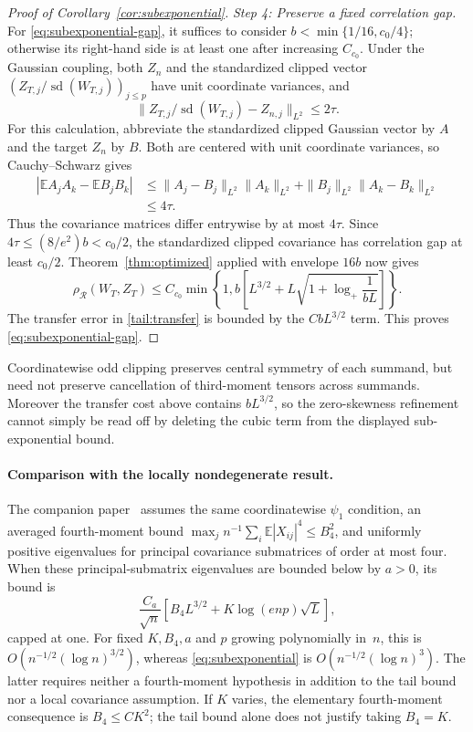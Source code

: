 \documentclass[11pt,letterpaper]{article}
\theoremstyle{remark}
\newcommand{\E}{\mathbb E}
\newcommand{\rh}{\rho_{\mathcal R}}
\begin{document}
\begin{proof}[Proof of Corollary~\ref{cor:subexponential}]
\emph{Step 4: Preserve a fixed correlation gap.}
For \eqref{eq:subexponential-gap}, it suffices to consider
\(b<\min\{1/16,c_0/4\}\); otherwise its right-hand side is at
least one after increasing \(C_{c_0}\).
Under the Gaussian coupling, both \(Z_n\) and the standardized clipped
vector \((Z_{T,j}/\operatorname{sd}(W_{T,j}))_{j\le p}\) have unit coordinate variances, and
\[
 \|Z_{T,j}/\operatorname{sd}(W_{T,j})-Z_{n,j}\|_{L^2}\le2\tau.
\]
For this calculation, abbreviate the standardized clipped Gaussian
vector by \(A\) and the target \(Z_n\) by \(B\). Both are centered
with unit coordinate variances, so Cauchy--Schwarz gives
\[
 \begin{aligned}
 |\E A_jA_k-\E B_jB_k|
 &\le\|A_j-B_j\|_{L^2}\|A_k\|_{L^2}
       +\|B_j\|_{L^2}\|A_k-B_k\|_{L^2}\\
 &\le4\tau.
 \end{aligned}
\]
Thus the covariance matrices differ entrywise by at most \(4\tau\). Since
\(4\tau\le(8/e^2)b<c_0/2\), the standardized clipped covariance
has correlation gap at least \(c_0/2\).
Theorem~\ref{thm:optimized} applied with envelope \(16b\) now gives
\[
 \rh(W_T,Z_T)\le C_{c_0}\min\left\{1,
 b\left[L^{3/2}+L\sqrt{1+\log_+\frac1{bL}}\right]\right\}.
\]
The transfer error in \eqref{tail:transfer} is bounded by the
\(CbL^{3/2}\) term. This proves \eqref{eq:subexponential-gap}.
\end{proof}

Coordinatewise odd clipping preserves central symmetry of each summand,
but need not preserve cancellation of third-moment tensors across summands.
Moreover the transfer cost above contains \(bL^{3/2}\), so the
zero-skewness refinement cannot simply be read off by deleting the
cubic term from the displayed sub-exponential bound.

\paragraph{Comparison with the locally nondegenerate result.}
The companion paper~\cite[Corollary~1]{Local} assumes the same
coordinatewise \(\psi_1\) condition, an averaged fourth-moment bound
\(\max_jn^{-1}\sum_i\E|X_{ij}|^4\le B_4^2\), and uniformly positive
eigenvalues for principal covariance submatrices of order at most four.
When these principal-submatrix eigenvalues are bounded below by \(a>0\), its bound is
\[
 \frac{C_a}{\sqrt n}\left[B_4L^{3/2}
                   +K\log(enp)\sqrt L\right],
\]
capped at one. For fixed \(K,B_4,a\) and \(p\) growing polynomially in~\(n\),
this is \(O(n^{-1/2}(\log n)^{3/2})\), whereas
\eqref{eq:subexponential} is \(O(n^{-1/2}(\log n)^3)\).
The latter requires neither a fourth-moment hypothesis in addition to
the tail bound nor a local covariance assumption. If \(K\) varies,
the elementary fourth-moment consequence is \(B_4\le C K^2\);
the tail bound alone does not justify taking \(B_4=K\).
\end{document}
